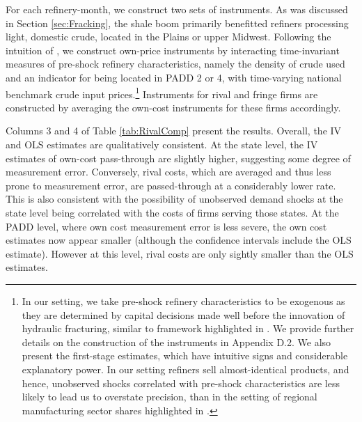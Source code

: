 \documentclass[12pt]{article}
\begin{document}
For each refinery-month, we construct two sets of instruments. As was discussed in Section \ref{sec:Fracking}, the shale boom primarily benefitted refiners processing light, domestic crude, located in the Plains or upper Midwest. Following the intuition of \cite{bartik_who_1991}, we construct own-price instruments by interacting time-invariant measures of pre-shock refinery characteristics, namely the density of crude used and an indicator for being located in PADD 2 or 4, with time-varying national benchmark crude input prices.\footnote{In our setting, we take pre-shock refinery characteristics to be exogenous as they are determined by capital decisions made well before the innovation of hydraulic fracturing, similar to framework highlighted in \citet{goldsmith2018bartik}.  We provide further details on the construction of the instruments in Appendix D.2. We also present the first-stage estimates, which have intuitive signs and considerable explanatory power.  In our setting refiners sell almost-identical products, and hence, unobserved shocks correlated with pre-shock characteristics are less likely to lead us to overstate precision, than in the setting of regional manufacturing sector shares highlighted in \citet{adao2019shift}.}  Instruments for rival and fringe firms are constructed by averaging the own-cost instruments for these firms accordingly.

Columns 3 and 4 of Table \ref{tab:RivalComp} present the results. Overall, the IV and OLS estimates are qualitatively consistent. At the state level, the IV estimates of own-cost pass-through are slightly higher, suggesting some degree of measurement error. Conversely, rival costs, which are averaged and thus less prone to measurement error, are passed-through at a considerably lower rate. This is also consistent with the possibility of unobserved demand shocks at the state level being correlated with the costs of firms serving those states. At the PADD level, where own cost measurement error is less severe, the own cost estimates now appear smaller (although the confidence intervals include the OLS estimate). However at this level, rival costs are only sightly smaller than the OLS estimates.
\end{document}
